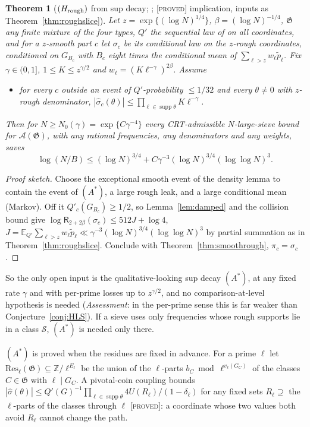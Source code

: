 \documentclass[10pt,reqno]{amsart}
\newtheorem{theorem}{Theorem}[section]
\theoremstyle{definition}
\theoremstyle{remark}
\newcommand{\A}{\mathcal A}
\newcommand{\cG}{\mathfrak G}
\newcommand{\E}{\mathbb E}
\newcommand{\Z}{\mathbb Z}
\newcommand{\lab}[1]{\textup{[\textsc{#1}]}}
\begin{document}
\begin{theorem}[$(H_{\rm rough})$ from sup decay; {\cite[Thm~4.2]{LS4}}; \lab{proved} implication, inputs as Theorem~\ref{thm:roughslice}]\label{thm:Astar}
Let $z=\exp\{(\log N)^{1/4}\}$, $\beta=(\log N)^{-1/4}$, $\cG$ any finite mixture of the four
types, $Q'$ the sequential law of \cite{KA2} on all coordinates, and for a
$z$-smooth part $c$ let $\sigma_c$ be its conditional law on the $z$-rough
coordinates, conditioned on $G_{B_c}$ with $B_c$ eight times the conditional
mean of $\sum_{\ell>z}w_\ell\tilde p_\ell$.  Fix $\gamma\in(0,1]$, $1\leq K\leq z^{\gamma/2}$ and $w_\ell=(K\ell^{-\gamma})^{2\beta}$.
Assume
\begin{itemize}
\item[$(A^*)$] for every $c$ outside an event of $Q'$-probability $\leq1/32$ and every
$\theta\neq0$ with $z$-rough denominator, $|\hat\sigma_c(\theta)|\leq\prod_{\ell\in\operatorname{supp}\theta}K\ell^{-\gamma}$.
\end{itemize}
Then for $N\geq N_0(\gamma)=\exp\{C\gamma^{-4}\}$ every CRT-admissible $N$-large-sieve bound
for $\A(\cG)$, with any rational frequencies, any denominators and any
weights, saves
\[
 \log(N/B)\leq(\log N)^{3/4}+C\gamma^{-3}(\log N)^{3/4}(\log\log N)^3.
\]
\end{theorem}
\begin{proof}[Proof sketch]
Choose the exceptional smooth event of the density lemma to contain the
event of $(A^*)$, a large rough leak, and a large conditional mean (Markov).
Off it $Q'_c(G_{B_c})\geq1/2$, so Lemma~\ref{lem:damped} and the collision bound give
$\log\mathsf R_{2+2\beta}(\sigma_c)\leq512J+\log4$, $J=\E_{Q'}\sum_{\ell>z}w_\ell\tilde p_\ell\ll\gamma^{-3}(\log N)^{3/4}(\log\log N)^3$ by
partial summation as in Theorem~\ref{thm:roughslice}.  Conclude with
Theorem~\ref{thm:smoothrough}, $\pi_c=\sigma_c$.
\end{proof}
So the only open input is the qualitative-looking sup decay $(A^*)$, at
any fixed rate $\gamma$ and with per-prime losses up to $z^{\gamma/2}$, and no
comparison-at-level hypothesis is needed (\emph{Assessment}: in the per-prime sense this is far
weaker than Conjecture~\ref{conj:HLS}).  If a sieve uses only frequencies
whose rough supports lie in a class $\mathcal S$, $(A^*)$ is needed only there.

$(A^*)$ is proved when the residues are fixed in advance.  For a prime $\ell$
let $\mathrm{Res}_\ell(\cG)\subseteq\Z/\ell^{E_\ell}$ be the union of the $\ell$-parts
$b_C\bmod\ell^{v_\ell(G_C)}$ of the classes $C\in\cG$ with $\ell\mid G_C$.  A pivotal-coin
coupling bounds $|\hat\sigma(\theta)|\leq Q'(G)^{-1}\prod_{\ell\in\operatorname{supp}\theta}4U(R_\ell)/(1-\delta_\ell)$
for any fixed sets $R_\ell\supseteq$ the $\ell$-parts of the classes through $\ell$
\cite[Lemma~5.1]{LS4} \lab{proved}: a coordinate whose two values both avoid
$R_\ell$ cannot change the path.
\end{document}

